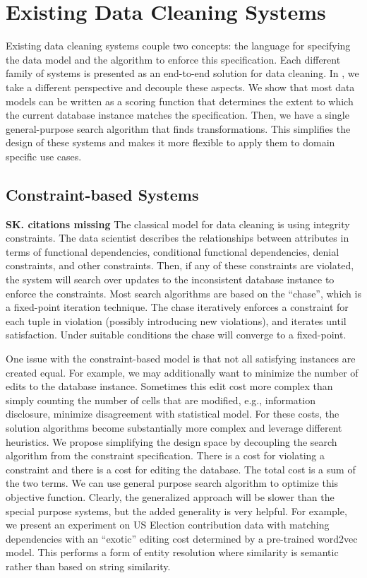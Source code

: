 \section{Existing Data Cleaning Systems}
Existing data cleaning systems couple two concepts: the language for specifying the data model and the algorithm to enforce this specification.
Each different family of systems is presented as an end-to-end solution for data cleaning.
In \sys, we take a different perspective and decouple these aspects.
We show that most data models can be written as a scoring function that determines the extent to which the current database instance matches the specification.
Then, we have a single general-purpose search algorithm that finds transformations.
This simplifies the design of these systems and makes it more flexible to apply them to domain specific use cases.

\subsection{Constraint-based Systems}
\textbf{SK. citations missing}
The classical model for data cleaning is using integrity constraints. The data scientist describes the relationships between attributes in terms of functional dependencies, conditional functional dependencies, denial constraints, and other constraints.
Then, if any of these constraints are violated, the system will search over updates to the inconsistent database instance to enforce the constraints.
Most search algorithms are based on the ``chase'', which is a fixed-point iteration technique. The chase iteratively enforces a constraint for each tuple in violation (possibly introducing new violations), and iterates until satisfaction.
Under suitable conditions the chase will converge to a fixed-point.

One issue with the constraint-based model is that not all satisfying instances are created equal. For example, we may additionally want to minimize the number of edits to the database instance.
Sometimes this edit cost more complex than simply counting the number of cells that are modified, e.g., information disclosure, minimize disagreement with statistical model.
For these costs, the solution algorithms become substantially more complex and leverage different heuristics.
We propose simplifying the design space by decoupling the search algorithm from the constraint specification.
There is a cost for violating a constraint and there is a cost for editing the database.
The total cost is a sum of the two terms.
We can use general purpose search algorithm to optimize this objective function.
Clearly, the generalized approach will be slower than the special purpose systems, but the added generality is very helpful.
For example, we present an experiment on US Election contribution data with matching dependencies with an ``exotic'' editing cost determined by a pre-trained word2vec model. This performs a form of entity resolution where similarity is semantic rather than based on string similarity.

